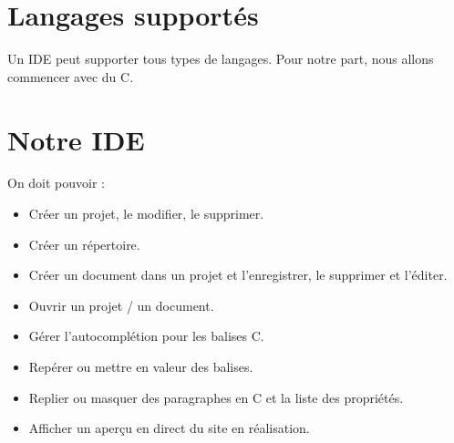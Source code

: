 \documentclass[a4paper,12pt]{article} %
\begin{document}
\section{Langages supportés}
	Un IDE peut supporter tous types de langages. Pour notre part, nous allons commencer avec du C.
	
\section{Notre IDE}
	On doit pouvoir :
	\begin{itemize}
		\item Créer un projet, le modifier, le supprimer.
		\item Créer un répertoire.
		\item Créer un document dans un projet et l'enregistrer, le supprimer et l'éditer.
		\item Ouvrir un projet / un document.
		\item Gérer l'autocomplétion pour les balises C.
		\item Repérer ou mettre en valeur des balises.
		\item Replier ou masquer des paragraphes en C et la liste des propriétés.
		\item Afficher un aperçu en direct du site en réalisation.
	\end{itemize}
\end{document}
